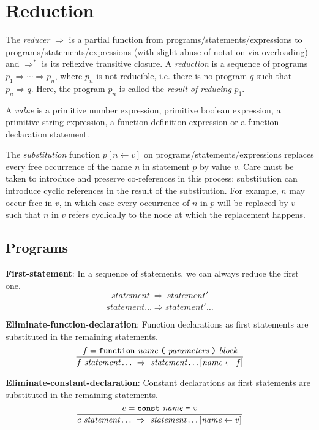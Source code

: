 \section*{Reduction}

The \emph{reducer} $\Rightarrow$ is a partial function from
programs/statements/expressions to
programs/statements/expressions (with slight abuse of notation
via overloading)
and $\Rightarrow^*$ is its reflexive transitive closure.
A \emph{reduction} is a sequence of programs
$p_1 \Rightarrow \cdots \Rightarrow p_n$,
where $p_n$ is not reducible, i.e. there is no
program $q$ such that $p_n \Rightarrow q$.
Here, the program $p_n$ is called the \emph{result
of reducing} $p_1$.

A \emph{value} is a primitive number expression,
primitive boolean expression,
a primitive string expression, a function definition
expression or a function declaration statement.

The \emph{substitution} function 
$p [ n \leftarrow v ]$ on programs/statements/expressions
replaces every free occurrence of the name $n$
in statement $p$ by value $v$. Care must be taken to introduce
and preserve
co-references in this process; substitution can introduce
cyclic references in the result of the substitution. For example,
$n$ may occur free in $v$, in which case
every occurrence of $n$ in $p$
will be replaced by $v$ such that $n$ in $v$ refers cyclically
to the node at which the replacement happens.

\subsection*{Programs}


\textbf{First-statement}: In a sequence of statements, we can always
reduce the first one.
\[
\frac{
  \textit{statement}\ \Rightarrow\ \textit{statement}'
}{  
  \textit{statement} \ldots
  \Rightarrow 
  \textit{statement}' \ldots
}
\]

\vspace{10mm}

\textbf{Eliminate-function-declaration}: Function declarations as first
statements are substituted in the remaining statements.
\[
\frac{
             f = \textbf{\texttt{function}}\  \textit{name} \ 
                 \textbf{\texttt{(}}\  \textit{parameters}
                 \ \textbf{\texttt{)}}\ \textit{block}
}{
f\ \textit{statement} \ldots\ 
  \Rightarrow\ 
  \textit{statement} \ldots[\textit{name} \leftarrow f]
}
\]

\vspace{10mm}
\textbf{Eliminate-constant-declaration}: Constant declarations as first
statements are substituted in the remaining statements.
\[
\frac{
             c = \textbf{\texttt{const}}\  \textit{name} \ 
             \textbf{\texttt{=}}\  \textit{v}
}{
c\ \textit{statement} \ldots\ 
  \Rightarrow \ 
  \textit{statement} \ldots[\textit{name} \leftarrow v]
}
\]

